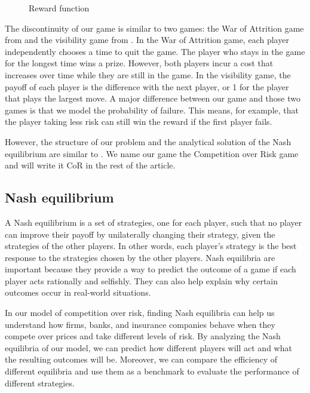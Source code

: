 \documentclass[preprint,12pt,authoryear]{elsarticle}
\theoremstyle{definition}
\begin{document}
\begin{figure}[htbp]
    \centering
    
    \caption{Reward function}
    \label{fig:reward}
\end{figure}


The discontinuity of our game is similar to two games: the War of Attrition game from \cite{smith1974theory} and the visibility game from \cite{Lotker2008-tx}. In the War of Attrition game, each player independently chooses a time to quit the game. The player who stays in the game for the longest time wins a prize. However, both players incur a cost that increases over time while they are still in the game. In the visibility game, the payoff of each player is the difference with the next player, or 1 for the player that plays the largest move. A major difference between our game and those two games is that we model the probability of failure. This means, for example, that the player taking less risk can still win the reward if the first player fails.

However, the structure of our problem and the analytical solution of the Nash equilibrium are similar to \cite{Lotker2008-tx}. We name our game the Competition over Risk game and will write it CoR in the rest of the article.

\subsection{Nash equilibrium}

A Nash equilibrium is a set of strategies, one for each player, such that no player can improve their payoff by unilaterally changing their strategy, given the strategies of the other players. In other words, each player's strategy is the best response to the strategies chosen by the other players. Nash equilibria are important because they provide a way to predict the outcome of a game if each player acts rationally and selfishly. They can also help explain why certain outcomes occur in real-world situations.

In our model of competition over risk, finding Nash equilibria can help us understand how firms, banks, and insurance companies behave when they compete over prices and take different levels of risk. By analyzing the Nash equilibria of our model, we can predict how different players will act and what the resulting outcomes will be. Moreover, we can compare the efficiency of different equilibria and use them as a benchmark to evaluate the performance of different strategies.
\end{document}
